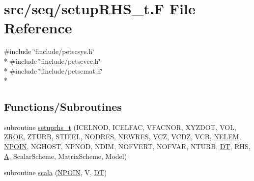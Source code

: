 \hypertarget{seq_2setup_r_h_s__t_8_f}{\section{src/seq/setup\-R\-H\-S\-\_\-t.F File Reference}
\label{seq_2setup_r_h_s__t_8_f}
}
{\ttfamily \#include \char`\"{}finclude/petscsys.\-h\char`\"{}}\\*
{\ttfamily \#include \char`\"{}finclude/petscvec.\-h\char`\"{}}\\*
{\ttfamily \#include \char`\"{}finclude/petscmat.\-h\char`\"{}}\\*
\subsection*{Functions/\-Subroutines}
\begin{DoxyCompactItemize}
\item 
subroutine \hyperlink{seq_2setup_r_h_s__t_8_f_a5ff19471b1236283e869ad2595608445}{setuprhs\-\_\-t} (I\-C\-E\-L\-N\-O\-D, I\-C\-E\-L\-F\-A\-C, V\-F\-A\-C\-N\-O\-R, X\-Y\-Z\-D\-O\-T, V\-O\-L, \hyperlink{myts_8com_a0c4fbcdb78e6b50c8919d714e4b5a694}{Z\-R\-O\-E}, Z\-T\-U\-R\-B, S\-T\-I\-F\-E\-L, N\-O\-D\-R\-E\-S, N\-E\-W\-R\-E\-S, V\-C\-Z, V\-C\-D\-Z, V\-C\-B, \hyperlink{mesh_8com_aee5e75b79d0e815c0603cfbccc618957}{N\-E\-L\-E\-M}, \hyperlink{mesh_8com_ae28c1572321efcd8715b974d87d20c58}{N\-P\-O\-I\-N}, N\-G\-H\-O\-S\-T, N\-P\-N\-O\-D, N\-D\-I\-M, N\-O\-F\-V\-E\-R\-T, N\-O\-F\-V\-A\-R, N\-T\-U\-R\-B, \hyperlink{myts_8com_a41549d5ede5e2b840495daf35608da41}{D\-T}, R\-H\-S, \hyperlink{ibc2_8com_ad2108d58343608772fff791c23da58f5}{A}, Scalar\-Scheme, Matrix\-Scheme, Model)
\item 
subroutine \hyperlink{seq_2setup_r_h_s__t_8_f_ae9aba4ae2061b9d88fba7e0ceee69dd7}{scala} (\hyperlink{mesh_8com_ae28c1572321efcd8715b974d87d20c58}{N\-P\-O\-I\-N}, V, \hyperlink{myts_8com_a41549d5ede5e2b840495daf35608da41}{D\-T})
\end{DoxyCompactItemize}


